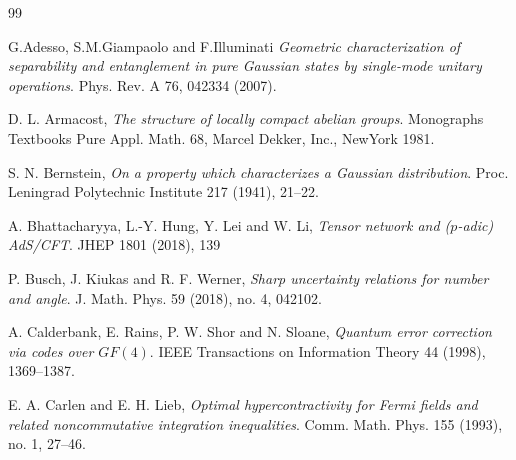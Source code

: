 \documentclass[12pt,reqno]{amsart}
\theoremstyle{definition}
\theoremstyle{definition}
\theoremstyle{definition}
\numberwithin{thm}{section}
\numberwithin{equation}{section}
\begin{document}
\begin{thebibliography}{99}

 G.Adesso, S.M.Giampaolo and F.Illuminati 
\textit{Geometric characterization of separability and entanglement in pure Gaussian states by single-mode unitary operations}. Phys. Rev. A 76, 042334 (2007).

 D. L. Armacost, 
\textit{The structure of locally compact abelian groups}. Monographs Textbooks
Pure Appl. Math. 68, Marcel Dekker, Inc., NewYork 1981.

 S. N. Bernstein, 
\textit{On a property which characterizes a Gaussian distribution}.
Proc. Leningrad Polytechnic Institute 217 (1941), 21--22.

 A. Bhattacharyya, L.-Y. Hung, Y. Lei and W. Li,
\textit{Tensor network and ($p$-adic) AdS/CFT}.
JHEP 1801 (2018), 139


P. Busch, J. Kiukas and  R. F. Werner, 
\textit{Sharp uncertainty relations for number and angle}.
J. Math. Phys. 59 (2018), no. 4, 042102.


 A. Calderbank, E. Rains, P. W. Shor and N. Sloane,
\textit{Quantum error correction via codes over $GF(4)$}. 
IEEE Transactions on Information Theory 44 (1998), 1369--1387.





 E. A. Carlen and E. H. Lieb,
\textit{Optimal hypercontractivity for Fermi fields and related noncommutative integration inequalities}.
Comm. Math. Phys. 155 (1993), no. 1, 27--46.



\end{thebibliography}
\end{document}
